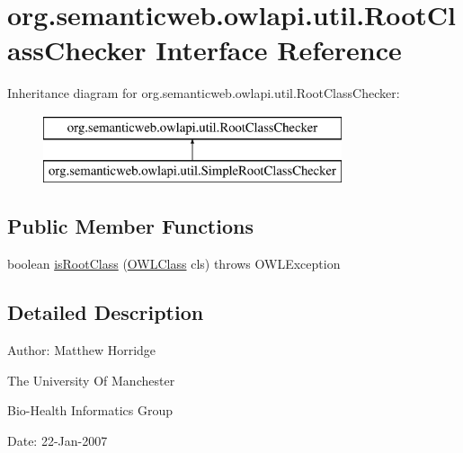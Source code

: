 \hypertarget{interfaceorg_1_1semanticweb_1_1owlapi_1_1util_1_1_root_class_checker}{\section{org.\-semanticweb.\-owlapi.\-util.\-Root\-Class\-Checker Interface Reference}
\label{interfaceorg_1_1semanticweb_1_1owlapi_1_1util_1_1_root_class_checker}
}
Inheritance diagram for org.\-semanticweb.\-owlapi.\-util.\-Root\-Class\-Checker\-:\begin{figure}[H]
\begin{center}
\leavevmode
\includegraphics[height=2.000000cm]{interfaceorg_1_1semanticweb_1_1owlapi_1_1util_1_1_root_class_checker}
\end{center}
\end{figure}
\subsection*{Public Member Functions}
\begin{DoxyCompactItemize}
\item 
boolean \hyperlink{interfaceorg_1_1semanticweb_1_1owlapi_1_1util_1_1_root_class_checker_aa0b6d00e25c11e364b011eaa061c84db}{is\-Root\-Class} (\hyperlink{interfaceorg_1_1semanticweb_1_1owlapi_1_1model_1_1_o_w_l_class}{O\-W\-L\-Class} cls)  throws O\-W\-L\-Exception
\end{DoxyCompactItemize}


\subsection{Detailed Description}
Author\-: Matthew Horridge\par
 The University Of Manchester\par
 Bio-\/\-Health Informatics Group\par
 Date\-: 22-\/\-Jan-\/2007\par
\par
 


